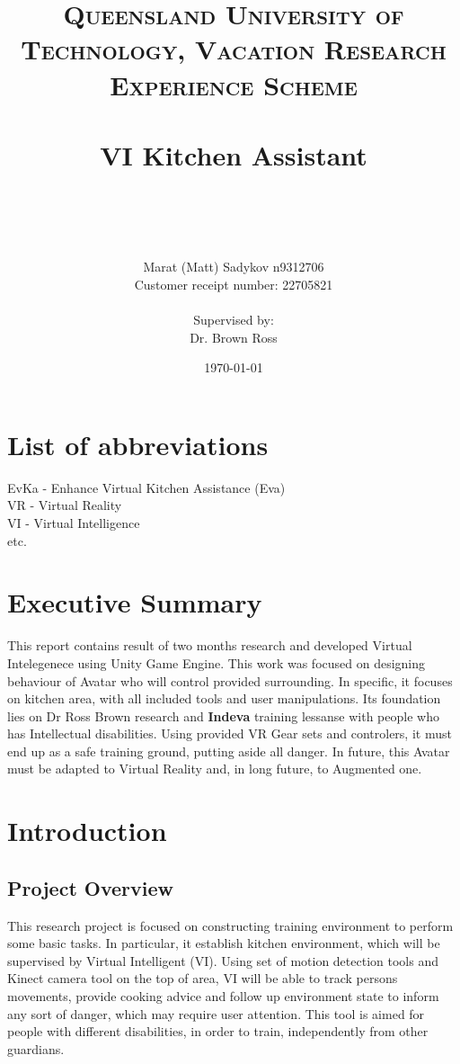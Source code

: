 \documentclass[18pt]{article}
\title{	
	\normalfont \normalsize 
	\textsc{Queensland University of Technology, Vacation Research Experience Scheme} \\ [25pt] 
	\horrule{0.5pt} \\[0.4cm] %
	\huge VI Kitchen Assistant \\ %
	\author{Marat (Matt) Sadykov \small n9312706 \\  Customer receipt number: \small 22705821 \\ \\ Supervised by: \\ Dr. Brown Ross \\ }
	\date{\normalsize\today} %
	\horrule{2pt} \\[0.5cm] %
}
\numberwithin{equation}{section} %
\numberwithin{figure}{section} %
\numberwithin{table}{section} %
\begin{document}
\maketitle
\newpage
\renewcommand*\contentsname{Table of Contents}
\tableofcontents
\listoffigures
\section{List of abbreviations}
	EvKa - Enhance Virtual Kitchen Assistance (Eva) \\
	VR - Virtual Reality \\
	VI - Virtual Intelligence \\
	etc.
\newpage	
\section{Executive Summary}
	This report contains result of two months research and developed Virtual Intelegenece using Unity Game Engine. This work was focused on designing behaviour of Avatar who will control provided surrounding. In specific, it focuses on kitchen area, with all included tools and user manipulations. Its foundation lies on Dr Ross Brown research and \textbf{Indeva} training lessanse with people who has Intellectual disabilities. Using provided VR Gear sets and controlers, it must end up as a safe training ground, putting aside all danger. In future, this Avatar must be adapted to Virtual Reality and, in long future, to Augmented one.
\section{Introduction}
	\subsection{Project Overview}
		This research project is focused on constructing training environment to perform some basic tasks. In particular, it establish kitchen environment, which will be supervised by Virtual Intelligent (VI). Using set of motion detection tools and Kinect camera tool on the top of area, VI will be able to track persons movements, provide cooking advice and follow up environment state to inform any sort of danger, which may require user attention. This tool is aimed for people with different disabilities, in order to train, independently from other guardians. \\
			
\end{document}
